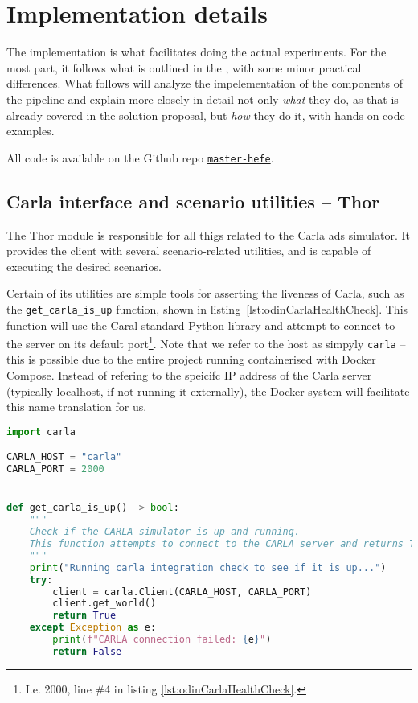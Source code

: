 \chapter{Implementation details}

The implementation is what facilitates doing the actual experiments. For the
most part, it follows what is outlined in the , with
some minor practical differences. 
What follows will analyze the impelementation of the components of the \hefe{}
pipeline and explain more closely in detail not only \emph{what} they do, as
that is already covered in the solution proposal, but \emph{how} they do it, with
hands-on code examples.

All code is available on the Github repo \href{https://github.com/orjahren/master-hefe}{\texttt{master-hefe}}.

\section{Carla interface and scenario utilities -- Thor}

The Thor module is responsible for all thigs related to the Carla \acrshort{ads}
simulator. It provides the client with several scenario-related utilities, and
is capable of executing the desired scenarios. 


Certain of its utilities are simple tools for asserting the liveness of Carla,
such as the \texttt{get\_carla\_is\_up} function, shown in
listing~\ref{lst:odinCarlaHealthCheck}. This function will use the Caral
standard Python library and attempt to connect to the server on its default
port\footnote{I.e. \num{2000}, line \#4 in listing
\ref{lst:odinCarlaHealthCheck}.}. Note that we refer to the host as simpyly
\texttt{carla} -- this is possible due to the entire project running
containerised with Docker Compose. Instead of refering to the speicifc IP
address of the Carla server (typically localhost, if not running it externally),
the Docker system will facilitate this name translation for us.

\begin{lstlisting}[caption={Exerpt from carla\_interface.py, demonstrating the implementation of a Carla health check.}, label={lst:odinCarlaHealthCheck}, language={Python}]
import carla

CARLA_HOST = "carla"
CARLA_PORT = 2000


def get_carla_is_up() -> bool:
    """
    Check if the CARLA simulator is up and running.
    This function attempts to connect to the CARLA server and returns True if successful, otherwise False.
    """
    print("Running carla integration check to see if it is up...")
    try:
        client = carla.Client(CARLA_HOST, CARLA_PORT)
        client.get_world()
        return True
    except Exception as e:
        print(f"CARLA connection failed: {e}")
        return False
\end{lstlisting}

